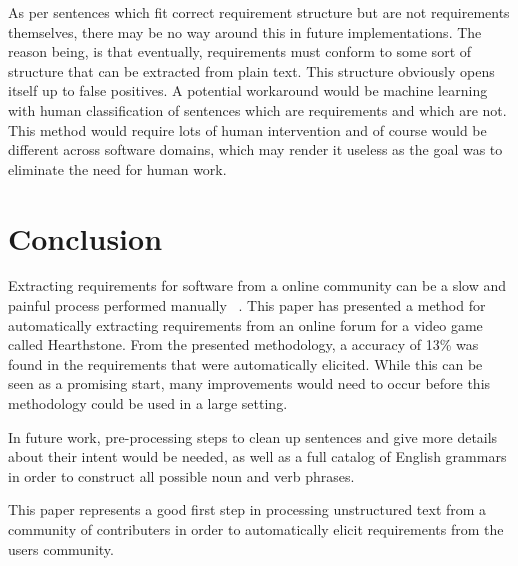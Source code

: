 \documentclass[conference]{IEEEtran}
\begin{document}
As per sentences which fit correct requirement structure but are not requirements themselves, there may be no way around this
in future implementations. The reason being, is that eventually, requirements must conform to some sort of structure that
can be extracted from plain text. This structure obviously opens itself up to false positives. A potential workaround
would be machine learning with human classification of sentences which are requirements and which are not. This method would
require lots of human intervention and of course would be different across software domains, which may render it useless
as the goal was to eliminate the need for human work.


\section{Conclusion}

Extracting requirements for software from a online community can be a slow and painful process performed manually
~\cite{Gottipati:2011:FRA}.
This paper has presented a method for automatically extracting requirements from an online forum for a video game
called Hearthstone. From the presented methodology, a accuracy of 13\% was found in the requirements that were
automatically elicited. While this can be seen as a promising start, many improvements would need to occur before
this methodology could be used in a large setting.

In future work, pre-processing steps to clean up sentences and give more details about their intent would be needed,
as well as a full catalog of English grammars in order to construct all possible noun and verb phrases.

This paper represents a good first step in processing unstructured text from a community of contributers in order
to automatically elicit requirements from the users community.





\end{document}
